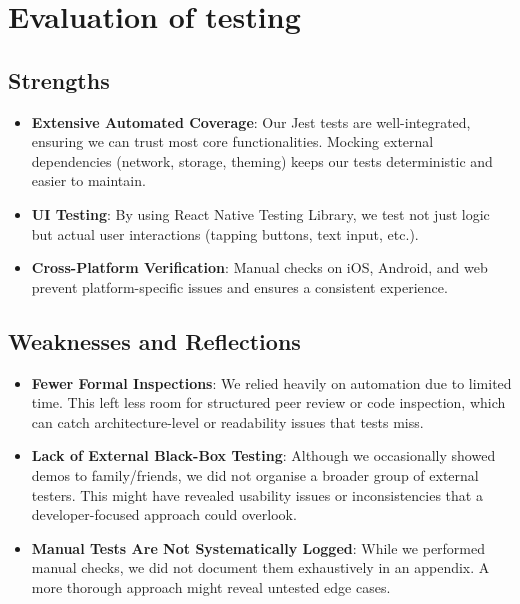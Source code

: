 \section{Evaluation of testing} \label{sect:testing:evaluation}

\subsection{Strengths} \begin{itemize} \item \textbf{Extensive Automated Coverage}: Our Jest tests are well-integrated, ensuring we can trust most core functionalities. Mocking external dependencies (network, storage, theming) keeps our tests deterministic and easier to maintain. \item \textbf{UI Testing}: By using React Native Testing Library, we test not just logic but actual user interactions (tapping buttons, text input, etc.). \item \textbf{Cross-Platform Verification}: Manual checks on iOS, Android, and web prevent platform-specific issues and ensures a consistent experience. \end{itemize}

\subsection{Weaknesses and Reflections} \begin{itemize} \item \textbf{Fewer Formal Inspections}: We relied heavily on automation due to limited time. This left less room for structured peer review or code inspection, which can catch architecture-level or readability issues that tests miss. \item \textbf{Lack of External Black-Box Testing}: Although we occasionally showed demos to family/friends, we did not organise a broader group of external testers. This might have revealed usability issues or inconsistencies that a developer-focused approach could overlook. \item \textbf{Manual Tests Are Not Systematically Logged}: While we performed manual checks, we did not document them exhaustively in an appendix. A more thorough approach might reveal untested edge cases. \end{itemize}

